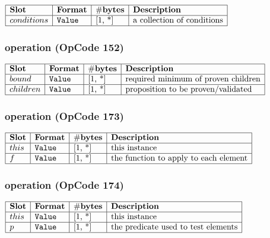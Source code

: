 \noindent
\(\begin{array}{| l | l | l | l |}
    \hline
    \bf{Slot} & \bf{Format} & \bf{\#bytes} & \bf{Description} \\
    \hline
         conditions & \lst{Value} & \text{[1, *]} & \text{a collection of conditions} \\
    \hline
      
\end{array}\)
       

\subsubsection{ operation (OpCode 152)}

\noindent
\(\begin{array}{| l | l | l | l |}
    \hline
    \bf{Slot} & \bf{Format} & \bf{\#bytes} & \bf{Description} \\
    \hline
         bound & \lst{Value} & \text{[1, *]} & \text{required minimum of proven children} \\
    \hline
           children & \lst{Value} & \text{[1, *]} & \text{proposition to be proven/validated} \\
    \hline
      
\end{array}\)
       

\subsubsection{ operation (OpCode 173)}

\noindent
\(\begin{array}{| l | l | l | l |}
    \hline
    \bf{Slot} & \bf{Format} & \bf{\#bytes} & \bf{Description} \\
    \hline
         this & \lst{Value} & \text{[1, *]} & \text{this instance} \\
    \hline
           f & \lst{Value} & \text{[1, *]} & \text{the function to apply to each element} \\
    \hline
      
\end{array}\)
       

\subsubsection{ operation (OpCode 174)}

\noindent
\(\begin{array}{| l | l | l | l |}
    \hline
    \bf{Slot} & \bf{Format} & \bf{\#bytes} & \bf{Description} \\
    \hline
         this & \lst{Value} & \text{[1, *]} & \text{this instance} \\
    \hline
           p & \lst{Value} & \text{[1, *]} & \text{the predicate used to test elements} \\
    \hline
      
\end{array}\)
       

